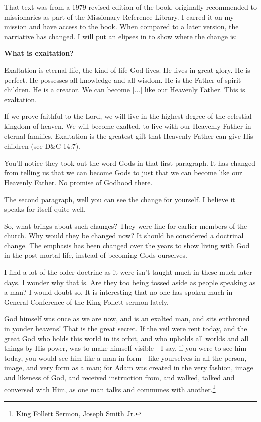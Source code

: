 \documentclass{article}
\begin{document}
That text was from a 1979 revised edition of the book, originally recommended
to missionaries as part of the Missionary Reference Library. I carred it on 
my mission and have access to the book. When compared to a later version, 
the narriative has changed. I will put an elipses in to show where the 
change is:

\begin{displayquote}
\textbf{What is exaltation?}

Exaltation is eternal life, the kind of life God lives. He lives in great glory. 
He is perfect. He possesses all knowledge and all wisdom. He is the 
Father of spirit children. He is a creator. We can become [...] like our 
Heavenly Father. This is exaltation.

If we prove faithful to the Lord, we will live in the highest degree of the 
celestial kingdom of heaven. We will become exalted, to live with our 
Heavenly Father in eternal families. Exaltation is the greatest gift that 
Heavenly Father can give His children (see D\&C 14:7).\cite[275-280]{gp2}
\end{displayquote}

You'll notice they took out the word Gods in that first paragraph. It has 
changed from telling us that we can become Gods to just that we can become
like our Heavenly Father. No promise of Godhood there.

The second paragraph, well you can see the change for yourself. I believe it 
speaks for itself quite well.

So, what brings about such changes? They were fine for earlier members of the
church. Why would they be changed now? It should be considered a doctrinal 
change. The emphasis has been changed over the years to show living with God 
in the post-mortal life, instead of becoming Gods ourselves.

I find a lot of the older doctrine as it were isn't taught much in these much 
later days. I wonder why that is. Are they too being tossed aside as people 
speaking as a man? I would doubt so. It is interesting that no one has spoken 
much in General Conference of the King Follett sermon lately.

\begin{displayquote}
God himself was once as we are now, and is an exalted man, and sits enthroned 
in yonder heavens! That is the great secret. If the veil were rent today, 
and the great God who holds this world in its orbit, and who upholds all 
worlds and all things by His power, was to make himself visible—I say, if 
you were to see him today, you would see him like a man in form—like yourselves 
in all the person, image, and very form as a man; for Adam was created in the 
very fashion, image and likeness of God, and received instruction from, and 
walked, talked and conversed with Him, as one man talks and communes with 
another.\footnote{King Follett Sermon, Joseph Smith Jr.}
\end{displayquote}
\end{document}
